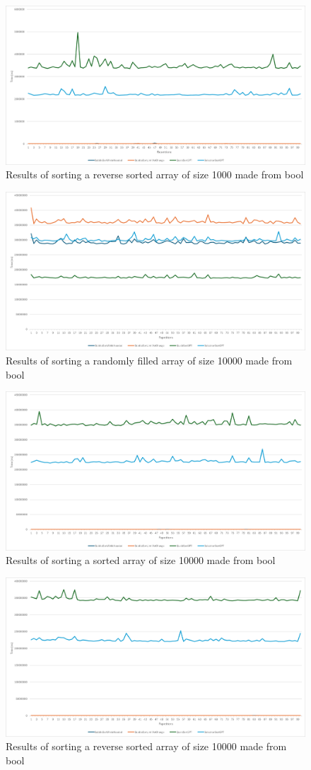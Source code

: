 \documentclass{article}
\begin{document}
\begin{figure}[!h]
    \centering
    \includegraphics[width=0.7\linewidth]{bool_1000_reverse_sorted.png}
    \caption{Results of sorting a reverse sorted array of size 1000 made from bool}
    \label{fig:bool_1000_reverse_sorted}
\end{figure}

\begin{figure}[!h]
    \centering
    \includegraphics[width=0.7\linewidth]{bool_10000_random.png}
    \caption{Results of sorting a randomly filled array of size 10000 made from bool}
    \label{fig:bool_10000_random}
\end{figure}

\begin{figure}[!h]
    \centering
    \includegraphics[width=0.7\linewidth]{bool_10000_sorted.png}
    \caption{Results of sorting a sorted array of size 10000 made from bool}
    \label{fig:bool_10000_sorted}
\end{figure}

\begin{figure}[!h]
    \centering
    \includegraphics[width=0.7\linewidth]{bool_10000_reverse_sorted.png}
    \caption{Results of sorting a reverse sorted array of size 10000 made from bool}
    \label{fig:bool_10000_reverse_sorted}
\end{figure}

\clearpage
\end{document}
